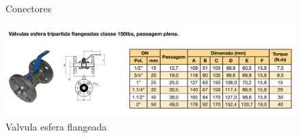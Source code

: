\begin{anexosenv}
\begin{figure}[h]
\centering
{}
\qquad
{}
\caption{Conectores}
\label{fig:conectores}
\end{figure}

\begin{figure}
    \centering
    \includegraphics{figuras/valvula_esfera.png}
    \caption{Valvula esfera flangeada}
    \label{valvula}
\end{figure}

\label{motorcarro}



\end{anexosenv}

